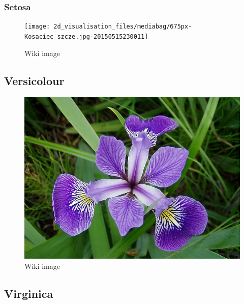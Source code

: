 \documentclass[
  letterpaper,
  DIV=11,
  numbers=noendperiod]{scrartcl}
\begin{document}
\subsubsection{Setosa}\label{setosa}

\begin{figure}[H]

{\centering \texttt{[image: 2d\_visualisation\_files/mediabag/675px-Kosaciec\_szcze.jpg-20150515230011]}

}

\caption{Wiki image}

\end{figure}%

\subsection{Versicolour}\label{versicolour}

\begin{figure}[H]

{\centering \includegraphics{2d_visualisation_files/mediabag/675px-Iris_versicolo.jpg}

}

\caption{Wiki image}

\end{figure}%

\subsection{Virginica}\label{virginica}
\end{document}
